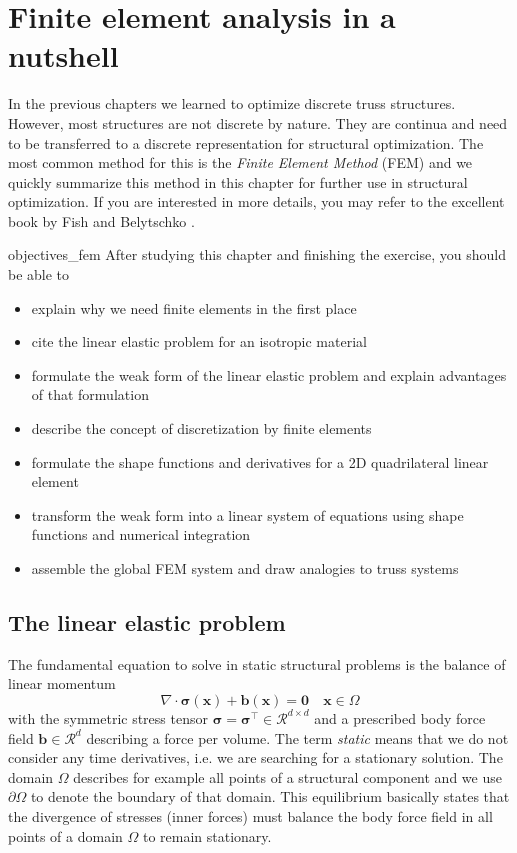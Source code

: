 \chapter{Finite element analysis in a nutshell}
In the previous chapters we learned to optimize discrete truss structures. However, most structures are not discrete by nature. They are continua and need to be transferred to a discrete representation for structural optimization. The most common method for this is the \emph{Finite Element Method} (FEM) and we quickly summarize this method in this chapter for further use in structural optimization. If you are interested in more details, you may refer to the excellent book by Fish and Belytschko \cite{Fish2007}.

\begin{objectives}{}{objectives_fem}
After studying this chapter and finishing the exercise, you should be able to 
\begin{itemize}[label=$\dots$]
    \item explain why we need finite elements in the first place 
    \item cite the linear elastic problem for an isotropic material
    \item formulate the weak form of the linear elastic problem and explain advantages of that formulation
    \item describe the concept of discretization by finite elements 
    \item formulate the shape functions and derivatives for a 2D quadrilateral linear element 
    \item transform the weak form into a linear system of equations using shape functions and numerical integration
    \item assemble the global FEM system and draw analogies to truss systems
\end{itemize}
\end{objectives}

\section{The linear elastic problem}
The fundamental equation to solve in static structural problems is the balance of linear momentum
\begin{equation}
    \nabla \cdot \pmb{\sigma}(\mathbf{x}) + \mathbf{b}(\mathbf{x})= \mathbf{0} 
    \quad 
    \mathbf{x} \in \Omega
    \label{eq:linear_momentum_balance}
\end{equation}
with the symmetric stress tensor $\pmb{\sigma}=\pmb{\sigma}^\top \in \mathcal{R}^{d \times d}$ and a prescribed body force field $\mathbf{b} \in \mathcal{R}^d$ describing a force per volume. The term \emph{static} means that we do not consider any time derivatives, i.e. we are searching for a stationary solution.  The domain $\Omega$ describes for example all points of a structural component and we use $\partial \Omega$ to denote the boundary of that domain. This equilibrium basically states that the divergence of stresses (inner forces) must balance the body force field in all points of a domain $\Omega$ to remain stationary. 

